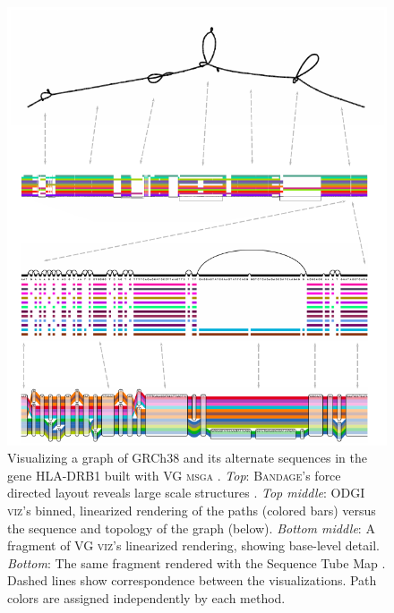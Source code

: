 \begin{figure}[p]
  \begin{minipage}[c]{0.67\textwidth}
    \includegraphics[width=\textwidth]{figures/fig2viz.pdf}
  \end{minipage}\hfill
  \begin{minipage}[c]{0.3\textwidth}
    \caption{
      Visualizing a graph of GRCh38 and its alternate sequences in the gene HLA-DRB1 built with \textsc{VG msga} \cite{Garrison_2019}.
      \emph{Top}: \textsc{Bandage}'s force directed layout reveals large scale structures \cite{Wick_2015}.
      \emph{Top middle}: \textsc{ODGI viz}'s binned, linearized rendering of the paths (colored bars) versus the sequence and topology of the graph (below).
      \emph{Bottom middle}: A fragment of \textsc{VG viz}'s linearized rendering, showing base-level detail.
      \emph{Bottom}: The same fragment rendered with the Sequence Tube Map \cite{Beyer_2019}.
      Dashed lines show correspondence between the visualizations.
      Path colors are assigned independently by each method.
    } \label{fig:visualization}
  \end{minipage}
\end{figure}

